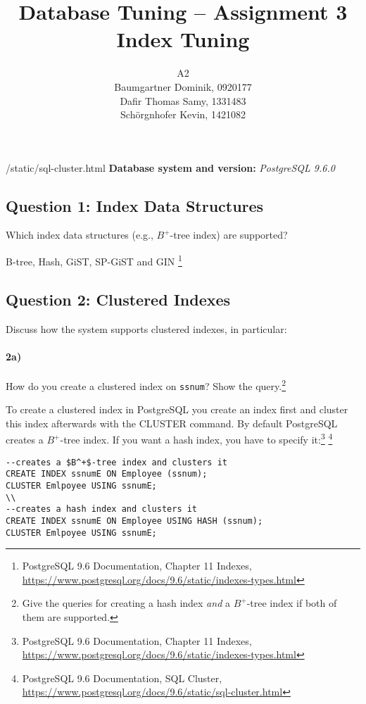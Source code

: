 \documentclass[11pt]{scrartcl}
\title{
  \textbf{\large Database Tuning -- Assignment 3}\\
  Index Tuning
}
\author{
 A2\\
\large Baumgartner Dominik, 0920177 \\
\large Dafir Thomas Samy, 1331483 \\
\large Sch\"orgnhofer Kevin, 1421082
}
\begin{document}
\maketitle

/static/sql-cluster.html
\noindent\textbf{Database system and version:} {\it PostgreSQL 9.6.0}

\subsection*{Question 1: Index Data Structures} Which index data structures (e.g., $B^+$-tree
index) are supported?

B-tree, Hash, GiST, SP-GiST and GIN
\footnote{PostgreSQL 9.6
  Documentation, Chapter 11 Indexes,
  \url{https://www.postgresql.org/docs/9.6/static/indexes-types.html}}


\subsection*{Question 2: Clustered Indexes} Discuss how the system
supports clustered indexes, in particular:

\paragraph{2a)} How do you create a clustered index on {\tt ssnum}?
Show the query.\footnote{Give the queries for creating a hash index
  \emph{and} a $B^+$-tree index if both of them are supported.}

\smallskip

To create a clustered index in PostgreSQL you create an index first and cluster this index afterwards with the CLUSTER command. By default PostgreSQL creates a $B^+$-tree index. If you want a hash index, you have to specify it:\footnote{PostgreSQL 9.6
  Documentation, Chapter 11 Indexes,
  \url{https://www.postgresql.org/docs/9.6/static/indexes-types.html}}
\footnote{PostgreSQL 9.6
  Documentation, SQL Cluster,
  \url{https://www.postgresql.org/docs/9.6/static/sql-cluster.html}}

{\small
\begin{verbatim}
--creates a $B^+$-tree index and clusters it
CREATE INDEX ssnumE ON Employee (ssnum);
CLUSTER Emlpoyee USING ssnumE;
\\
--creates a hash index and clusters it
CREATE INDEX ssnumE ON Employee USING HASH (ssnum);
CLUSTER Emlpoyee USING ssnumE;
\end{verbatim}
}
\end{document}
